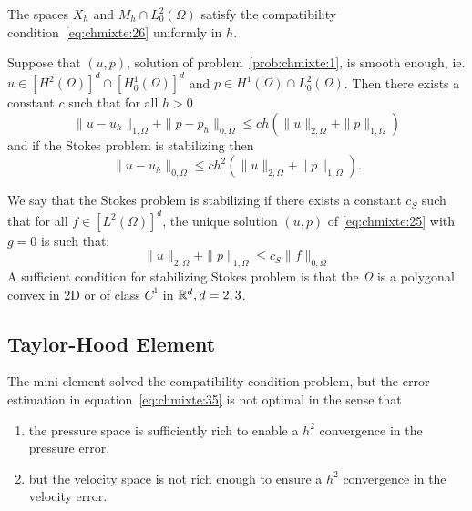   \begin{lemma}
    \label{lem:3}
    The spaces $X_h$ and $M_h \cap L^2_0(\Omega)$ satisfy the compatibility
    condition~\eqref{eq:chmixte:26} uniformly in $h$.
  \end{lemma}

  \begin{theorem}
    \label{thr:chmixte:3}
    Suppose that $(u,p)$, solution of problem~\ref{prob:chmixte:1}, is smooth enough,
    ie. $u \in [H^2(\Omega)]^d \cap [H^1_0(\Omega)]^d$ and $p\in H^1(\Omega)
    \cap L^2_0(\Omega)$. Then there exists a constant $c$ such that for all $h
    >0$
    \begin{equation}
      \label{eq:chmixte:34}
      \| u- u_h \|_{1,\Omega} + \|p-p_h\|_{0,\Omega} \leq c h (\|u\|_{2,\Omega}
      +\|p\|_{1,\Omega})
    \end{equation}
    and if the Stokes problem is stabilizing then
    \begin{equation}
      \label{eq:chmixte:35}
      \|u-u_h\|_{0,\Omega} \leq c h^2 ( \|u\|_{2,\Omega} +\|p\|_{1,\Omega}).
    \end{equation}
  \end{theorem}
  \begin{definition}
    \label{def:chmixte:4}
    We say that the Stokes problem is stabilizing if there exists a constant
    $c_S$ such that for all $f \in [L^2(\Omega)]^d$, the unique solution $(u,p)$
    of \eqref{eq:chmixte:25} with $g=0$ is such that:
    \begin{equation}
      \label{eq:chmixte:36}
      \|u\|_{2,\Omega} + \|p\|_{1,\Omega} \leq c_S \|f\|_{0,\Omega}
    \end{equation}
    A sufficient condition for stabilizing Stokes problem is that the $\Omega$
    is a polygonal convex in 2D or of class $C^1$  in $\mathbb R^{d}, d=2,3$.
  \end{definition}

\subsection{Taylor-Hood Element}
\label{sec:taylor-hood-element}


  The mini-element solved the compatibility condition problem, but the error
  estimation in equation~\eqref{eq:chmixte:35} is not optimal in the sense that
  \begin{enumerate}
  \item the pressure space is sufficiently rich to enable a $h^2$ convergence in
    the pressure error,
  \item but the velocity space is not rich enough to ensure a $h^2$ convergence
    in the velocity error.
  \end{enumerate}

